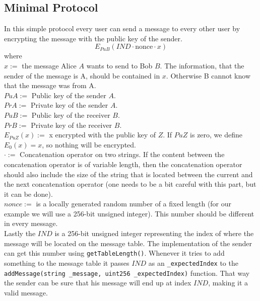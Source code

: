 \documentclass[a4paper]{article} %
\begin{document}
\subsection{Minimal Protocol}
In this simple protocol every user can send a message to every other user by encrypting the message with the public key of the sender.
$$E_{PuB}(IND \cdot \text{nonce} \cdot x)$$
\noindent
where \\
$x :=$ the message Alice $A$ wants to send to Bob $B$. The information, that the sender of the message is A, should be contained in $x$. Otherwise B cannot know that the message was from A.\\
$PuA :=$ Public key of the sender $A$. \\
$PrA :=$ Private key of the sender $A$. \\
$PuB :=$ Public key of the receiver $B$. \\
$PrB :=$ Private key of the receiver $B$. \\
$E_{PuZ}(x) :=$ x encrypted with the public key of $Z$. If $PuZ$ is zero, we define $E_0(x) = x$, so nothing will be encrypted. \\
$\cdot :=$ Concatenation operator on two strings. If the content between the concatenation operator is of variable length, then the concatenation operator should also include the size of the string that is located between the current and the next concatenation operator (one needs to be a bit careful with this part, but it can be done). \\ 
$nonce :=$ is a locally generated random number of a fixed length (for our example we will use a 256-bit unsigned integer). This number should be different in every message. \\

\noindent
Lastly the $IND$ is a 256-bit unsigned integer representing the index of where the message will be located on the message table. The implementation of the sender can get this number using \lstinline{getTableLength()}. Whenever it tries to add something to the message table it passes $IND$ as an \lstinline{_expectedIndex} to the \lstinline{addMessage(string _message, uint256 _expectedIndex)} function. That way the sender can be sure that his message will end up at index $IND$, making it a valid message. \\
\end{document}
